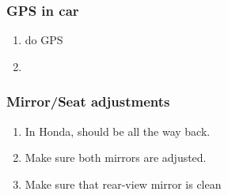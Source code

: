 \begin{frame}
\frametitle{GPS in car}
\begin{enumerate}
\item \small  do GPS
\item \small
\end{enumerate}
\end{frame}



\begin{frame}
\frametitle{Mirror/Seat adjustments}
\begin{enumerate}
\item \small In Honda, should be all the way back.
\item \small Make sure both mirrors are adjusted.
\item \small Make sure that rear-view mirror is clean
\end{enumerate}
\end{frame}
